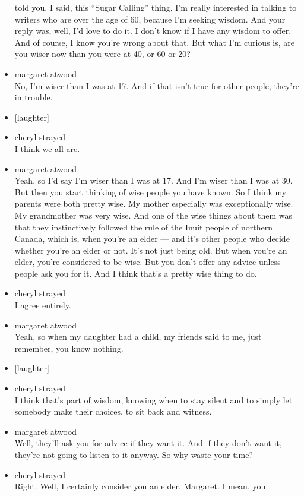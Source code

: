 \begin{itemize}
  told you. I said, this ``Sugar Calling'' thing, I'm really interested
  in talking to writers who are over the age of 60, because I'm seeking
  wisdom. And your reply was, well, I'd love to do it. I don't know if I
  have any wisdom to offer. And of course, I know you're wrong about
  that. But what I'm curious is, are you wiser now than you were at 40,
  or 60 or 20?
\item
  margaret atwood\\
  No, I'm wiser than I was at 17. And if that isn't true for other
  people, they're in trouble.
\item
  {[}laughter{]}
\item
  cheryl strayed\\
  I think we all are.
\item
  margaret atwood\\
  Yeah, so I'd say I'm wiser than I was at 17. And I'm wiser than I was
  at 30. But then you start thinking of wise people you have known. So I
  think my parents were both pretty wise. My mother especially was
  exceptionally wise. My grandmother was very wise. And one of the wise
  things about them was that they instinctively followed the rule of the
  Inuit people of northern Canada, which is, when you're an elder ---
  and it's other people who decide whether you're an elder or not. It's
  not just being old. But when you're an elder, you're considered to be
  wise. But you don't offer any advice unless people ask you for it. And
  I think that's a pretty wise thing to do.
\item
  cheryl strayed\\
  I agree entirely.
\item
  margaret atwood\\
  Yeah, so when my daughter had a child, my friends said to me, just
  remember, you know nothing.
\item
  {[}laughter{]}
\item
  cheryl strayed\\
  I think that's part of wisdom, knowing when to stay silent and to
  simply let somebody make their choices, to sit back and witness.
\item
  margaret atwood\\
  Well, they'll ask you for advice if they want it. And if they don't
  want it, they're not going to listen to it anyway. So why waste your
  time?
\item
  cheryl strayed\\
  Right. Well, I certainly consider you an elder, Margaret. I mean, you

\end{itemize}
